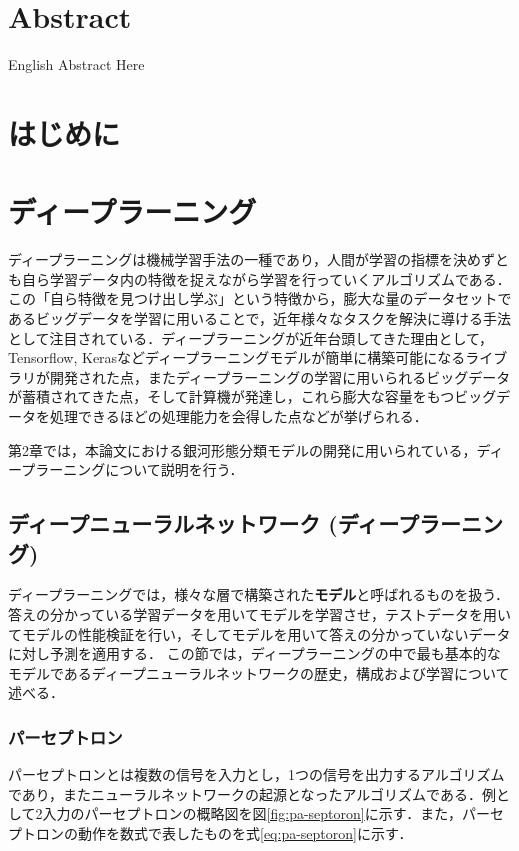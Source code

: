 \documentclass[a4j, 11pt]{jreport}
\begin{document}
\chapter*{Abstract}
English Abstract Here


\newpage
\tableofcontents       %
\thispagestyle{empty}  %
\pagebreak
{} %


\chapter{はじめに}

\newpage
\chapter{ディープラーニング}
ディープラーニングは機械学習手法の一種であり，人間が学習の指標を決めずとも自ら学習データ内の特徴を捉えながら学習を行っていくアルゴリズムである．この「自ら特徴を見つけ出し学ぶ」という特徴から，膨大な量のデータセットであるビッグデータを学習に用いることで，近年様々なタスクを解決に導ける手法として注目されている．ディープラーニングが近年台頭してきた理由として，Tensorflow, Kerasなどディープラーニングモデルが簡単に構築可能になるライブラリが開発された点，またディープラーニングの学習に用いられるビッグデータが蓄積されてきた点，そして計算機が発達し，これら膨大な容量をもつビッグデータを処理できるほどの処理能力を会得した点などが挙げられる．

第2章では，本論文における銀河形態分類モデルの開発に用いられている，ディープラーニングについて説明を行う．
\section{ディープニューラルネットワーク (ディープラーニング)}
ディープラーニングでは，様々な層で構築された\textbf{モデル}と呼ばれるものを扱う．答えの分かっている学習データを用いてモデルを学習させ，テストデータを用いてモデルの性能検証を行い，そしてモデルを用いて答えの分かっていないデータに対し予測を適用する．
この節では，ディープラーニングの中で最も基本的なモデルであるディープニューラルネットワークの歴史，構成および学習について述べる．

\subsection{パーセプトロン}
パーセプトロンとは複数の信号を入力とし，1つの信号を出力するアルゴリズムであり，またニューラルネットワークの起源となったアルゴリズムである．例として2入力のパーセプトロンの概略図を図\ref{fig:pa-septoron}に示す．また，パーセプトロンの動作を数式で表したものを式\ref{eq:pa-septoron}に示す．
\end{document}
